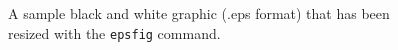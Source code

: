 \documentclass{acm_proc_article-sp}
\begin{document}
\begin{figure}
\centering
{}
\caption{A sample black and white graphic (.eps format)
that has been resized with the \texttt{epsfig} command.}
\end{figure}

%

%
%

\balancecolumns
\end{document}
